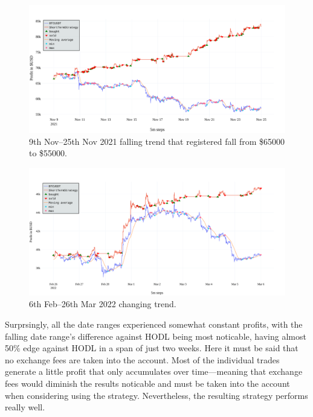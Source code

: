 \begin{figure}[!hbt]
    \centering
    \includegraphics[width=\columnwidth]{figures/short-term-falling.pdf}
    \caption{9th Nov--25th Nov 2021 falling trend that registered fall from \$65000 to \$55000.}
    \label{figure-short-term-falling}
\end{figure}

\begin{figure}[!hbt]
    \centering
    \includegraphics[width=\columnwidth]{figures/short-term-changing.pdf}
    \caption{6th Feb--26th Mar 2022 changing trend.}
    \label{figure-short-term-changing}
\end{figure}

Surprsingly, all the date ranges experienced somewhat constant profits, with the falling date range's difference against HODL being most noticable, having almost 50\% edge against HODL in a span of just two weeks. Here it must be said that no exchange fees are taken into the account. Most of the individual trades generate a little profit that only accumulates over time---meaning that exchange fees would diminish the results noticable and must be taken into the account when considering using the strategy. Nevertheless, the resulting strategy performs really well.

